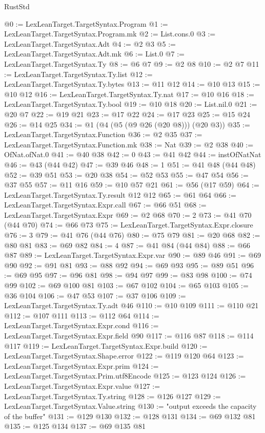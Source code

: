 \begin{lexlean}{RustStd}
\begin{coremodule}
{\begin{coremodule}
{{{{{{{{{{{{{{{{{{{{{{{{{{{{{{@0 := LexLeanTarget.TargetSyntax.Program
@1 := LexLeanTarget.TargetSyntax.Program.mk
@2 := List.cons.{0}
@3 := LexLeanTarget.TargetSyntax.Adt
@4 := @2 @3
@5 := LexLeanTarget.TargetSyntax.Adt.mk
@6 := List.{0}
@7 := LexLeanTarget.TargetSyntax.Ty
@8 := @6 @7
@9 := @2 @8
@10 := @2 @7
@11 := LexLeanTarget.TargetSyntax.Ty.list
@12 := LexLeanTarget.TargetSyntax.Ty.bytes
@13 := @11 @12
@14 := @10 @13
@15 := @10 @12
@16 := LexLeanTarget.TargetSyntax.Ty.nat
@17 := @10 @16
@18 := LexLeanTarget.TargetSyntax.Ty.bool
@19 := @10 @18
@20 := List.nil.{0}
@21 := @20 @7
@22 := @19 @21
@23 := @17 @22
@24 := @17 @23
@25 := @15 @24
@26 := @14 @25
@34 := @1 (@4 (@5 (@9 @26 (@20 @8))) (@20 @3))
@35 := LexLeanTarget.TargetSyntax.Function
@36 := @2 @35
@37 := LexLeanTarget.TargetSyntax.Function.mk
@38 := Nat
@39 := @2 @38
@40 := OfNat.ofNat.{0}
@41 := @40 @38
@42 := 0
@43 := @41 @42
@44 := instOfNatNat
@46 := @43 (@44 @42)
@47 := @39 @46
@48 := 1
@51 := @41 @48 (@44 @48)
@52 := @39 @51
@53 := @20 @38
@54 := @52 @53
@55 := @47 @54
@56 := @37 @55
@57 := @11 @16
@59 := @10 @57 @21
@61 := @56 (@17 @59)
@64 := LexLeanTarget.TargetSyntax.Ty.result @12 @12
@65 := @61 @64
@66 := LexLeanTarget.TargetSyntax.Expr.call
@67 := @66 @51
@68 := LexLeanTarget.TargetSyntax.Expr
@69 := @2 @68
@70 := 2
@73 := @41 @70 (@44 @70)
@74 := @66 @73
@75 := LexLeanTarget.TargetSyntax.Expr.closure
@76 := 3
@79 := @41 @76 (@44 @76)
@80 := @75 @79
@81 := @20 @68
@82 := @80 @81
@83 := @69 @82
@84 := 4
@87 := @41 @84 (@44 @84)
@88 := @66 @87
@89 := LexLeanTarget.TargetSyntax.Expr.var
@90 := @89 @46
@91 := @69 @90
@92 := @91 @81
@93 := @88 @92
@94 := @69 @93
@95 := @89 @51
@96 := @69 @95
@97 := @96 @81
@98 := @94 @97
@99 := @83 @98
@100 := @74 @99
@102 := @69 @100 @81
@103 := @67 @102
@104 := @65 @103
@105 := @36 @104
@106 := @47 @53
@107 := @37 @106
@109 := LexLeanTarget.TargetSyntax.Ty.adt @46
@110 := @10 @109
@111 := @110 @21
@112 := @107 @111
@113 := @112 @64
@114 := LexLeanTarget.TargetSyntax.Expr.cond
@116 := LexLeanTarget.TargetSyntax.Expr.field @90
@117 := @116 @87
@118 := @114 @117
@119 := LexLeanTarget.TargetSyntax.Expr.build
@120 := LexLeanTarget.TargetSyntax.Shape.error
@122 := @119 @120 @64
@123 := LexLeanTarget.TargetSyntax.Expr.prim
@124 := LexLeanTarget.TargetSyntax.Prim.utf8Encode
@125 := @123 @124
@126 := LexLeanTarget.TargetSyntax.Expr.value
@127 := LexLeanTarget.TargetSyntax.Ty.string
@128 := @126 @127
@129 := LexLeanTarget.TargetSyntax.Value.string
@130 := "output exceeds the capacity of the buffer"
@131 := @129 @130
@132 := @128 @131
@134 := @69 @132 @81
@135 := @125 @134
@137 := @69 @135 @81
}}}}}}}}}}}}}}}}}}}}}}}}}}}}}}
\end{coremodule}}
\end{coremodule}
\end{lexlean}
